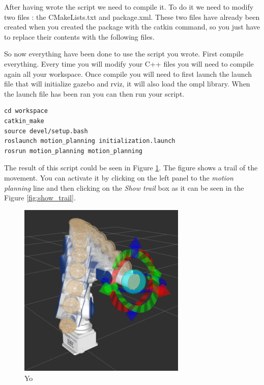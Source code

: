 

After having wrote the script we need to compile it. To do it we need to modify two files : the CMakeLists.txt and package.xml. These two files have already been created when you created the package with the catkin command, so you just have to replace their contents with the following files.






So now everything have been done to use the script you wrote. First compile everything. Every time you will modify your C++ files you will need to compile again all your workspace. Once compile you will need to first launch the launch file that will initialize gazebo and rviz, it will also load the ompl library. When the launch file has been ran you can then run your script.


\begin{lstlisting}
cd workspace
catkin_make
source devel/setup.bash
roslaunch motion_planning initialization.launch
rosrun motion_planning motion_planning
\end{lstlisting}


The result of this script could be seen in Figure \ref{fig:simple_moving}. The figure shows a trail of the movement. You can activate it by clicking on the left panel to the \emph{motion planning} line and then clicking on the \emph{Show trail} box as it can be seen in the Figure \ref{fig:show_trail}.  

\begin{figure}
\includegraphics[width=8cm]{images/installation_first/simple_moving.png}
\centering
\caption{Yo}
\label{fig:simple_moving}
\end{figure}



